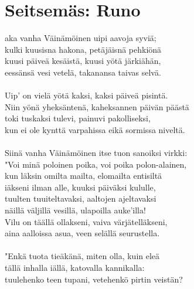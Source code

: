 
\chapter*{Seitsemäs: Runo}

aka vanha Väinämöinen uipi aavoja syviä;      \\
kulki kuusisna hakona, petäjäisnä pehkiönä                \\
kuusi päiveä kesäistä, kuusi yötä järkiähän,              \\
eessänsä vesi vetelä, takanansa taivas selvä.             \\
                                                          \\
Uip' on vielä yötä kaksi, kaksi päiveä pisintä.           \\
Niin yönä yheksäntenä, kaheksannen päivän päästä          \\
toki tuskaksi tulevi, painuvi pakolliseksi,               \\
kun ei ole kynttä varpahissa eikä sormissa niveltä.       \\
                                                          \\
Siinä vanha Väinämöinen itse tuon sanoiksi virkki:        \\
"Voi minä poloinen poika, voi poika polon-alainen,        \\
kun läksin omilta mailta, elomailta entisiltä             \\
iäkseni ilman alle, kuuksi päiväksi kululle,              \\
tuulten tuuiteltavaksi, aaltojen ajeltavaksi              \\
näillä väljillä vesillä, ulapoilla auke'illa!             \\
Vilu on täällä ollakseni, vaiva värjätelläkseni,          \\
aina aalloissa asua, veen selällä seurustella.            \\
                                                          \\
"Enkä tuota tieäkänä, miten olla, kuin eleä               \\
tällä inhalla iällä, katovalla kannikalla:                \\
tuulehenko teen tupani, vetehenkö pirtin veistän?         \\
                                                          \\
